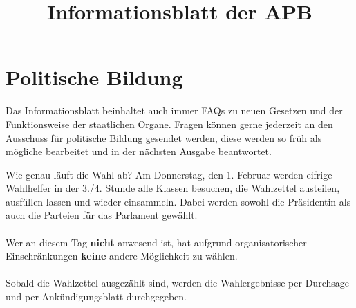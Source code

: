 \documentclass{sasbase}
\begin{document}
\title{Informationsblatt der APB}

\setcounter{secnumdepth}{5}

\mytitle

\parensstyle

\section{Politische Bildung}
Das Informationsblatt beinhaltet auch immer FAQs zu neuen Gesetzen und der Funktionsweise der staatlichen Organe.
Fragen k\"{o}nnen gerne jederzeit an den Ausschuss f\"{u}r politische Bildung gesendet werden, diese werden so fr\"{u}h als m\"{o}gliche bearbeitet und in der n\"{a}chsten Ausgabe beantwortet.


\begin{question}{Wie genau läuft die Wahl ab?}
    Am Donnerstag, den 1. Februar werden eifrige Wahlhelfer in der 3./4. Stunde alle Klassen besuchen, die Wahlzettel austeilen,
    ausfüllen lassen und wieder einsammeln. Dabei werden sowohl die Präsidentin als auch die
    Parteien für das Parlament gewählt.
    \\
    \\
    \noindent Wer an diesem Tag \textbf{nicht} anwesend ist, hat aufgrund organisatorischer Einschränkungen \textbf{keine} andere Möglichkeit zu wählen.
    \\
    \\
    
    \noindent Sobald die Wahlzettel ausgezählt sind, werden die Wahlergebnisse per Durchsage und per
    Ankündigungsblatt durchgegeben.
\end{question}
\end{document}
